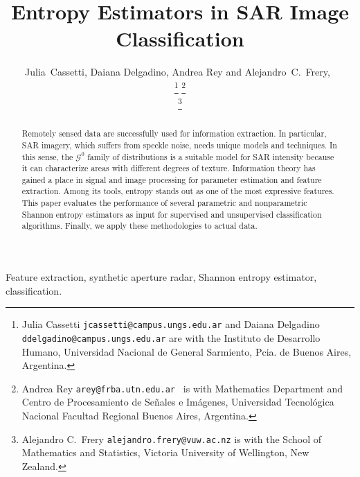 \documentclass[journal]{IEEEtran}
\begin{document}
\title{Entropy Estimators in SAR Image Classification}
\author{Julia~Cassetti, Daiana Delgadino, Andrea Rey and Alejandro~C.~Frery,~
	
	
	\thanks{Julia Cassetti \texttt{jcassetti@campus.ungs.edu.ar} and Daiana Delgadino \texttt{ddelgadino@campus.ungs.edu.ar} are with the  Instituto de Desarrollo Humano, Universidad Nacional de General Sarmiento, Pcia. de Buenos Aires, Argentina.}
	\thanks{Andrea Rey \texttt{arey@frba.utn.edu.ar } is with Mathematics Department and Centro de Procesamiento de Señales e Imágenes, Universidad Tecnológica Nacional Facultad Regional Buenos Aires, Argentina.}
	
	\thanks{Alejandro C.\ Frery \texttt{alejandro.frery@vuw.ac.nz} is with the School of Mathematics and Statistics, Victoria University of Wellington, New Zealand.} 
}

\maketitle

\begin{abstract}
	
	Remotely sensed data are successfully used for information extraction. 
	In particular, SAR imagery, which suffers from speckle noise, needs unique models and techniques. 
	In this sense, the $\mathcal G^0$ family of distributions is a suitable model for SAR intensity because it can characterize areas with different degrees of texture. 
	Information theory has gained a place in signal and image processing for parameter estimation and feature extraction.
	Among its tools, entropy stands out as one of the most expressive features.
	This paper evaluates the performance of several parametric and nonparametric Shannon entropy estimators as input for supervised and unsupervised classification algorithms.
	Finally, we apply these methodologies to actual data.
	
\end{abstract}

\begin{IEEEkeywords}
	Feature extraction, synthetic aperture radar, Shannon entropy estimator, classification.
\end{IEEEkeywords}
\end{document}
